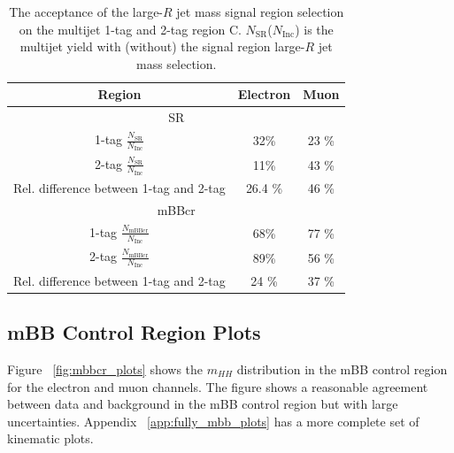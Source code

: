 \begin{table}[!htbp]
\begin{center}
\begin{tabular}{c|c|c}
\hline
Region    & Electron          & Muon      \\
\hline
\multicolumn{3}{c}{SR} \\
\hline
1-tag $\frac{N_\text{SR}}{N_\text{Inc}}$ &  32\% & 23 \% \\
2-tag $\frac{N_\text{SR}}{N_\text{Inc}}$ &  11\% & 43 \% \\
\hline \hline
Rel. difference between 1-tag and 2-tag & 26.4 \% & 46 \% \\
\hline
\multicolumn{3}{c}{mBBcr} \\
\hline
1-tag $\frac{N_\text{mBBcr}}{N_\text{Inc}}$ &  68\% & 77 \% \\
2-tag $\frac{N_\text{mBBcr}}{N_\text{Inc}}$ &  89\% & 56 \% \\
\hline \hline
Rel. difference between 1-tag and 2-tag &  24 \% &   37 \% \\
\end{tabular}
\end{center}
\caption[The acceptance of the large-$R$ jet mass signal region selection on the multijet
1-tag and 2-tag region C]{The acceptance of the large-$R$ jet mass signal region selection on the multijet
1-tag and 2-tag region C. $N_\text{SR}$($N_\text{Inc}$) is the multijet yield
with (without) the signal region large-$R$ jet mass selection.}
\label{tab:boosted_syst_qcd_norm_mBBAcc}
\end{table}
 
\subsection{mBB Control Region Plots}
\label{ssec:mbbcr_plots_whad}
Figure ~\ref{fig:mbbcr_plots} shows the $m_{HH}$ distribution in the mBB control region for the electron and muon channels. The figure shows a reasonable agreement between data and background in the mBB control region but with large uncertainties. Appendix ~\ref{app:fully_mbb_plots} has a more complete set of kinematic plots. 

